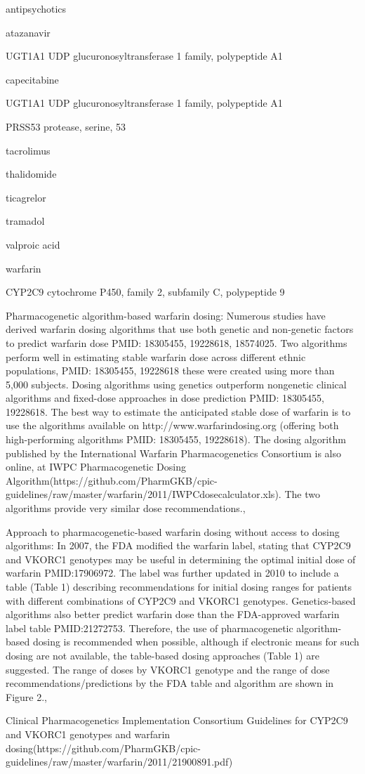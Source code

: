 \documentclass{resume} %
\begin{document}
\begin{rSection}{ antipsychotics }
\begin{rSection}{ atazanavir }
\begin{rSubsection}{ UGT1A1 }{ UDP glucuronosyltransferase 1 family, polypeptide A1 }{}{}
\begin{rSection}{ capecitabine }
\begin{rSubsection}{ UGT1A1 }{ UDP glucuronosyltransferase 1 family, polypeptide A1 }{}{}
\begin{rSubsection}{ PRSS53 }{ protease, serine, 53 }{}{}
\begin{rSection}{ tacrolimus }
\begin{rSection}{ thalidomide }
\begin{rSection}{ ticagrelor }
\begin{rSection}{ tramadol }
\begin{rSection}{ valproic acid }
\begin{rSection}{ warfarin }
\begin{rSubsection}{ CYP2C9 }{ cytochrome P450, family 2, subfamily C, polypeptide 9 }{}{}
\item Pharmacogenetic algorithm-based warfarin dosing: Numerous studies have derived warfarin dosing algorithms that use both genetic and non-genetic factors to predict warfarin dose PMID: 18305455, 19228618, 18574025. Two algorithms perform well in estimating stable warfarin dose across different ethnic populations,  PMID: 18305455, 19228618 these were created using more than 5,000 subjects. Dosing algorithms using genetics outperform nongenetic clinical algorithms and fixed-dose approaches in dose prediction PMID: 18305455, 19228618. The best way to estimate the anticipated stable dose of warfarin is to use the algorithms available on http://www.warfarindosing.org (offering both high-performing algorithms PMID: 18305455, 19228618). The dosing algorithm published by the International Warfarin Pharmacogenetics Consortium is also online, at IWPC Pharmacogenetic Dosing Algorithm(https://github.com/PharmGKB/cpic-guidelines/raw/master/warfarin/2011/IWPCdosecalculator.xls). The two algorithms provide very similar dose recommendations., 
 \newline
\item Approach to pharmacogenetic-based warfarin dosing without access to dosing algorithms:     In 2007, the FDA modified the warfarin label, stating that CYP2C9 and VKORC1 genotypes may be useful in determining the optimal initial dose of warfarin PMID:17906972. The label was further updated in 2010 to include a table (Table 1) describing recommendations for initial dosing ranges for patients with different combinations of CYP2C9 and VKORC1 genotypes. Genetics-based algorithms also better predict warfarin dose than the FDA-approved warfarin label table PMID:21272753. Therefore, the use of pharmacogenetic algorithm-based dosing is recommended when possible, although if electronic means for such dosing are not available, the table-based dosing approaches (Table 1) are suggested. The range of doses by VKORC1 genotype and the range of dose recommendations/predictions by the FDA table and algorithm are shown in Figure 2., 
 \newline
\item Clinical Pharmacogenetics Implementation Consortium Guidelines for CYP2C9 and VKORC1 genotypes and warfarin dosing(https://github.com/PharmGKB/cpic-guidelines/raw/master/warfarin/2011/21900891.pdf)
 \newline

\end{rSubsection}
\end{rSection}
\end{rSection}
\end{rSection}
\end{rSection}
\end{rSection}
\end{rSection}
\end{rSubsection}
\end{rSubsection}
\end{rSection}
\end{rSubsection}
\end{rSection}
\end{rSection}
\end{document}
